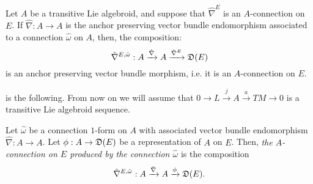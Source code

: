 \begin{example}
Let $A$ be a transitive Lie algebroid, and suppose that $\hat \nabla^E$ is an $A$-connection on $E$. If $\hat \nabla:A \to A$ is the anchor preserving vector bundle endomorphism associated to a connection $\hat \omega$ on $A$, then, the composition:
\begin{equation}
    \hat \nabla^{E, \hat \omega} : A \xrightarrow{\hat \nabla} A \xrightarrow{\hat \nabla^E} \mathfrak{D}(E)
\end{equation}
is an anchor preserving vector bundle morphism, i.e. it is an $A$-connection on $E$.
\end{example}

 is the following. From now on we will assume that $0 \to L \xrightarrow{j} A \xrightarrow{a} TM \to 0$ is a transitive Lie algebroid sequence.

\begin{definition}\label{definitionProducedAConnection}
Let $\hat \omega$ be a connection $1$-form on $A$ with associated vector bundle endomorphism $\hat \nabla:A \to A$. Let $\phi: A \to \alg D(E)$ be a representation of $A$ on $E$. Then, \emph{the $A$-connection on $E$ produced by the connection $\hat \omega$} is the composition
\begin{equation}
    \hat \nabla^{E, \hat \omega} : A \xrightarrow{\hat \nabla} A \xrightarrow{\phi} \alg D(E).
\end{equation}
\end{definition}

